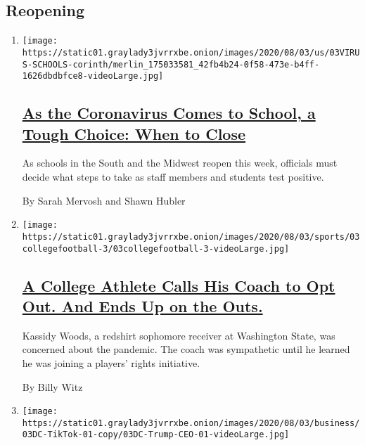 \hypertarget{reopening}{%
\subsection{Reopening}\label{reopening}}

\begin{enumerate}
\def\labelenumi{\arabic{enumi}.}
\item
  \texttt{[image: https://static01.graylady3jvrrxbe.onion/images/2020/08/03/us/03VIRUS-SCHOOLS-corinth/merlin\_175033581\_42fb4b24-0f58-473e-b4ff-1626dbdbfce8-videoLarge.jpg]}

  \hypertarget{as-the-coronavirus-comes-to-school-a-tough-choice-when-to-close}{%
  \subsection{\texorpdfstring{\href{/2020/08/03/us/school-closing-coronavirus.html}{As
  the Coronavirus Comes to School, a Tough Choice: When to
  Close}}{As the Coronavirus Comes to School, a Tough Choice: When to Close}}\label{as-the-coronavirus-comes-to-school-a-tough-choice-when-to-close}}

  As schools in the South and the Midwest reopen this week, officials
  must decide what steps to take as staff members and students test
  positive.

  By Sarah Mervosh and Shawn Hubler
\item
  \texttt{[image: https://static01.graylady3jvrrxbe.onion/images/2020/08/03/sports/03collegefootball-3/03collegefootball-3-videoLarge.jpg]}

  \hypertarget{a-college-athlete-calls-his-coach-to-opt-out-and-ends-up-on-the-outs}{%
  \subsection{\texorpdfstring{\href{/2020/08/03/sports/coronavirus-college-athletes-opt-out.html}{A
  College Athlete Calls His Coach to Opt Out. And Ends Up on the
  Outs.}}{A College Athlete Calls His Coach to Opt Out. And Ends Up on the Outs.}}\label{a-college-athlete-calls-his-coach-to-opt-out-and-ends-up-on-the-outs}}

  Kassidy Woods, a redshirt sophomore receiver at Washington State, was
  concerned about the pandemic. The coach was sympathetic until he
  learned he was joining a players' rights initiative.

  By Billy Witz
\item
  \texttt{[image: https://static01.graylady3jvrrxbe.onion/images/2020/08/03/business/03DC-TikTok-01-copy/03DC-Trump-CEO-01-videoLarge.jpg]}


\end{enumerate}
